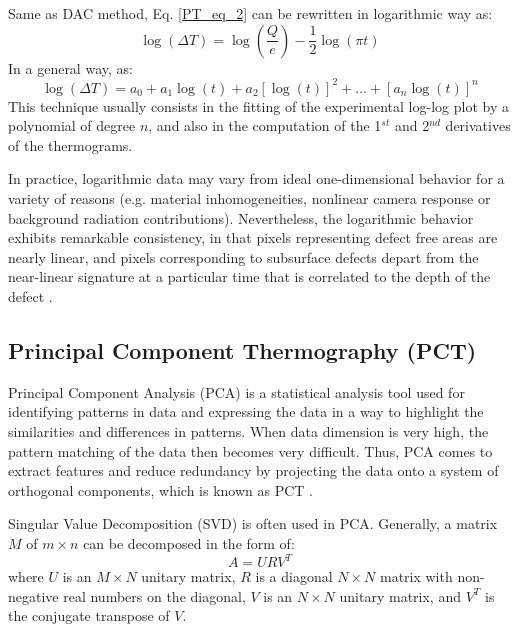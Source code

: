Same as DAC method, Eq. \ref{PT_eq_2} can be rewritten  in logarithmic way as:
\begin{equation}
\log (\Delta T) = \log (\frac{Q}{e}) - \frac{1}{2}\log (\pi t)
\end{equation}
In a general way, as: %
\begin{equation}
\log (\Delta T) = a_0 + a_1\log (t) + a_2[\log (t)]^2 +...+ [a_n\log(t)]^n
\end{equation}
This technique usually consists in the fitting of the experimental log-log plot by a polynomial of degree $n$, and also in the computation of the 1$^{st}$ and 2$^{nd}$ derivatives of the thermograms.

In practice, logarithmic data may vary from ideal one-dimensional behavior for a variety of reasons (e.g. material inhomogeneities, nonlinear camera response or background radiation contributions). Nevertheless, the logarithmic behavior exhibits remarkable consistency, in that pixels representing defect free areas are nearly linear, and pixels corresponding to subsurface defects depart from the near-linear signature at a particular time that is correlated to the depth of the defect \citep{Shepard2002,Shepard2003}.


\subsection{Principal Component Thermography (PCT)}
Principal Component Analysis (PCA) is a statistical analysis tool used for identifying patterns in data and expressing the data in a way to highlight the similarities and differences in patterns. When data dimension is very high, the pattern matching of the data then becomes very difficult. Thus, PCA comes to extract features and reduce redundancy by projecting the data onto a system of orthogonal components, which is known as PCT \citep{Rajic2002,Rajic2002a}. 

Singular Value Decomposition (SVD) is often used in PCA. Generally, a matrix $M$ of $m\times n$ can be decomposed in the form of:
\begin{equation}
A = U R V^T
\end{equation}
where $U$ is an $M\times N$ unitary matrix, $R$ is a diagonal $N \times N$ matrix with non-negative real numbers on the diagonal, $V$ is an $N\times N$ unitary matrix, and $V^T$ is the conjugate transpose of $V$.

